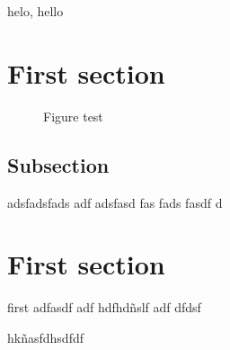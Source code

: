 helo, hello
\section{First section}
\blindtext[1]
\begin{figure}
	\begin{center}
		
	\end{center}
	\caption{Figure test}
\end{figure}
\blindtext[1]

\subsection{Subsection}
adsfadsfads adf adsfasd fas fads fasdf d

\section{First section}
first adfasdf adf hdfhdñslf adf dfdsf

hkñasfdhsdfdf
